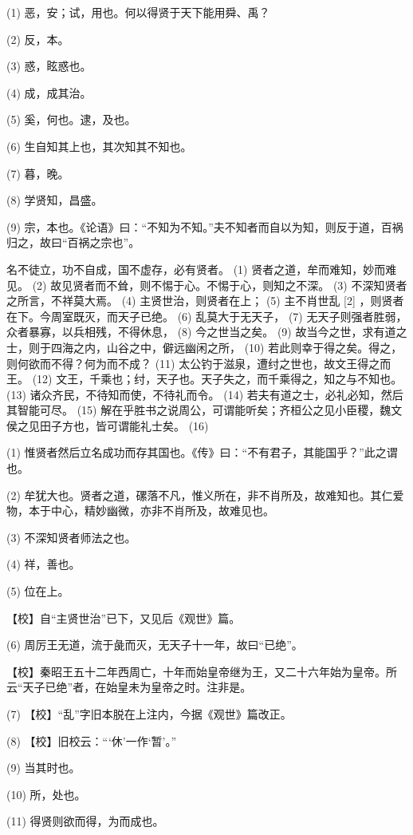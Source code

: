 \documentclass[12pt,UTF8]{ctexbook}
\begin{document}
(1) 恶，安；试，用也。何以得贤于天下能用舜、禹？

(2) 反，本。

(3) 惑，眩惑也。

(4) 成，成其治。

(5) 奚，何也。逮，及也。

(6) 生自知其上也，其次知其不知也。

(7) 暮，晚。

(8) 学贤知，昌盛。

(9) 宗，本也。《论语》曰：“不知为不知。”夫不知者而自以为知，则反于道，百祸归之，故曰“百祸之宗也”。

名不徒立，功不自成，国不虚存，必有贤者。 (1) 贤者之道，牟而难知，妙而难见。 (2) 故见贤者而不耸，则不惕于心。不惕于心，则知之不深。 (3) 不深知贤者之所言，不祥莫大焉。 (4) 主贤世治，则贤者在上； (5) 主不肖世乱 [2] ，则贤者在下。今周室既灭，而天子已绝。 (6) 乱莫大于无天子， (7) 无天子则强者胜弱，众者暴寡，以兵相残，不得休息， (8) 今之世当之矣。 (9) 故当今之世，求有道之士，则于四海之内，山谷之中，僻远幽闲之所， (10) 若此则幸于得之矣。得之，则何欲而不得？何为而不成？ (11) 太公钓于滋泉，遭纣之世也，故文王得之而王。 (12) 文王，千乘也；纣，天子也。天子失之，而千乘得之，知之与不知也。 (13) 诸众齐民，不待知而使，不待礼而令。 (14) 若夫有道之士，必礼必知，然后其智能可尽。 (15) 解在乎胜书之说周公，可谓能听矣；齐桓公之见小臣稷，魏文侯之见田子方也，皆可谓能礼士矣。 (16)

(1) 惟贤者然后立名成功而存其国也。《传》曰：“不有君子，其能国乎？”此之谓也。

(2) 牟犹大也。贤者之道，磥落不凡，惟义所在，非不肖所及，故难知也。其仁爱物，本于中心，精妙幽微，亦非不肖所及，故难见也。

(3) 不深知贤者师法之也。

(4) 祥，善也。

(5) 位在上。

【校】自“主贤世治”已下，又见后《观世》篇。

(6) 周厉王无道，流于彘而灭，无天子十一年，故曰“已绝”。

【校】秦昭王五十二年西周亡，十年而始皇帝继为王，又二十六年始为皇帝。所云“天子已绝”者，在始皇未为皇帝之时。注非是。

(7) 【校】“乱”字旧本脱在上注内，今据《观世》篇改正。

(8) 【校】旧校云：“‘休’一作‘暂’。”

(9) 当其时也。

(10) 所，处也。

(11) 得贤则欲而得，为而成也。
\end{document}
